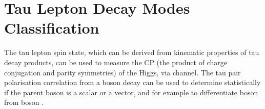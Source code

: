 \chapter{Tau Lepton Decay Modes Classification}
\label{chap:Tau}

%
{}%

The tau lepton spin state, which can be derived from kinematic properties of tau decay products, can be used to measure the CP (the product of charge conjugation and parity symmetries) of the Higgs, via \HiggsToTauTau channel\cite{Berge:2015nua}. The tau pair polarisation correlation from a boson decay can be used to determine statistically if the parent boson is a  scalar or a vector, and for example to differentiate \PH boson from \PZ boson \cite{Bullock:1991my}.


